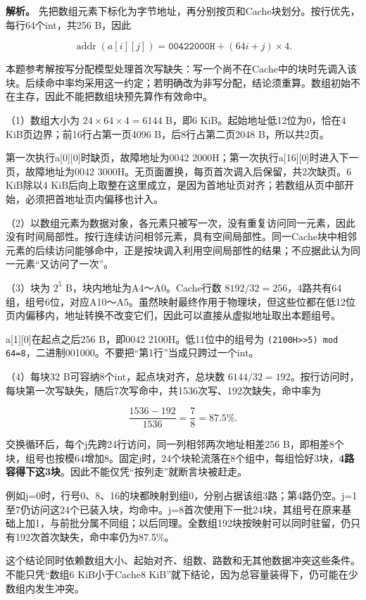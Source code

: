 \textbf{解析。} 先把数组元素下标化为字节地址，再分别按页和Cache块划分。按行优先，每行64个int，共256 B，因此

\[
\operatorname{addr}(a[i][j])=\mathtt{00422000H}+(64i+j)\times4.
\]

本题参考解按写分配模型处理首次写缺失：写一个尚不在Cache中的块时先调入该块。后续命中率均采用这一约定；若明确改为非写分配，结论须重算。数组初始不在主存，因此不能把数组块预先算作有效命中。

（1）数组大小为 \(24\times64\times4=6144\) B，即6 KiB。起始地址低12位为0，恰在4 KiB页边界；前16行占第一页4096 B，后8行占第二页2048 B，所以共2页。

第一次执行a{[}0{]}{[}0{]}时缺页，故障地址为0042 2000H；第一次执行a{[}16{]}{[}0{]}时进入下一页，故障地址为0042 3000H。无页面置换，每页首次调入后保留，共2次缺页。6 KiB除以4 KiB后向上取整在这里成立，是因为首地址页对齐；若数组从页中部开始，必须把首地址页内偏移也计入。

（2）以数组元素为数据对象，各元素只被写一次，没有重复访问同一元素，因此没有时间局部性。按行连续访问相邻元素，具有空间局部性。同一Cache块中相邻元素的后续访问能够命中，正是按块调入利用空间局部性的结果；不应据此认为同一元素``又访问了一次''。

（3）块为 \(2^5\) B，块内地址为A4～A0。Cache行数 \(8192/32=256\)，4路共有64组，组号6位，对应A10～A5。虽然映射最终作用于物理块，但这些位都在低12位页内偏移内，地址转换不改变它们，因此可以直接从虚拟地址取出本题组号。

a{[}1{]}{[}0{]}在起点之后256 B，即0042 2100H。低11位中的组号为 \texttt{(\allowbreak{}2100H>\allowbreak{}>\allowbreak{}5)\allowbreak{} mod 64=\allowbreak{}8}，二进制001000。不要把``第1行''当成只跨过一个int。

（4）每块32 B可容纳8个int，起点块对齐，总块数 \(6144/32=192\)。按行访问时，每块第一次写缺失，随后7次写命中，共1536次写、192次缺失，命中率为

\[
\frac{1536-192}{1536}=\frac78=87.5\%.
\]

交换循环后，每个j先跨24行访问，同一列相邻两次地址相差256 B，即相差8个块，组号也按模64增加8。固定j时，24个块轮流落在8个组中，每组恰好3块，\textbf{4路容得下这3块}。因此不能仅凭``按列走''就断言块被赶走。

例如j=0时，行号0、8、16的块都映射到组0，分别占据该组3路；第4路仍空。j=1至7仍访问这24个已装入块，均命中。j=8首次使用下一批24块，其组号在原来基础上加1，与前批分属不同组；以后同理。全数组192块按映射可以同时驻留，仍只有192次首次缺失，命中率仍为87.5\%。

这个结论同时依赖数组大小、起始对齐、组数、路数和无其他数据冲突这些条件。不能只凭``数组6 KiB小于Cache8 KiB''就下结论，因为总容量装得下，仍可能在少数组内发生冲突。

